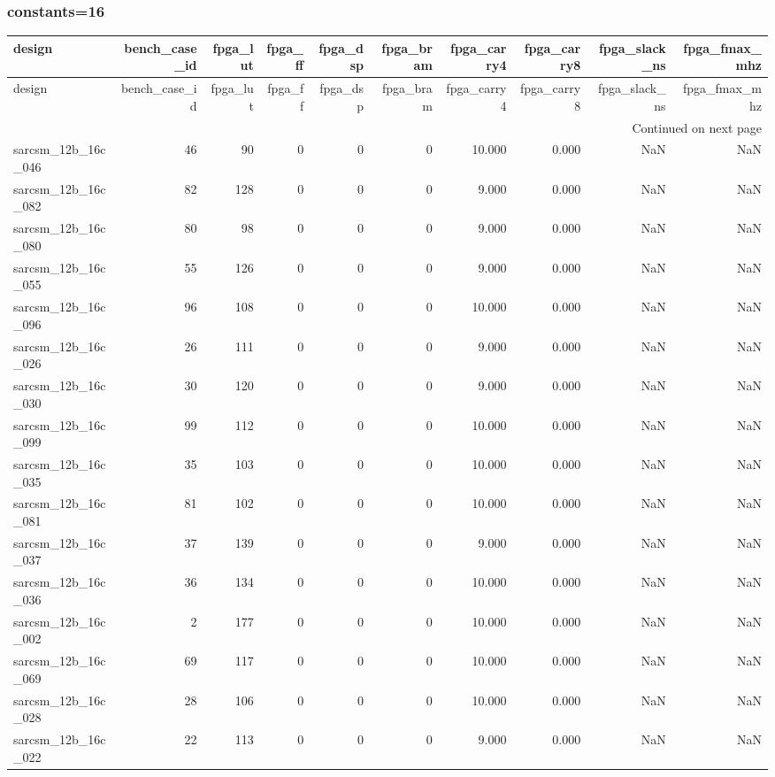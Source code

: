 \documentclass{article}
\begin{document}
\subsubsection*{constants=16}
\begin{longtable}{lrrrrrrrrr}
\toprule
design & bench\_case\_id & fpga\_lut & fpga\_ff & fpga\_dsp & fpga\_bram & fpga\_carry4 & fpga\_carry8 & fpga\_slack\_ns & fpga\_fmax\_mhz \\
\midrule
\endfirsthead
\toprule
design & bench\_case\_id & fpga\_lut & fpga\_ff & fpga\_dsp & fpga\_bram & fpga\_carry4 & fpga\_carry8 & fpga\_slack\_ns & fpga\_fmax\_mhz \\
\midrule
\endhead
\midrule
\multicolumn{10}{r}{Continued on next page} \\
\midrule
\endfoot
\bottomrule
\endlastfoot
sarcsm\_12b\_16c\_046 & 46 & 90 & 0 & 0 & 0 & 10.000 & 0.000 & NaN & NaN \\
sarcsm\_12b\_16c\_082 & 82 & 128 & 0 & 0 & 0 & 9.000 & 0.000 & NaN & NaN \\
sarcsm\_12b\_16c\_080 & 80 & 98 & 0 & 0 & 0 & 9.000 & 0.000 & NaN & NaN \\
sarcsm\_12b\_16c\_055 & 55 & 126 & 0 & 0 & 0 & 9.000 & 0.000 & NaN & NaN \\
sarcsm\_12b\_16c\_096 & 96 & 108 & 0 & 0 & 0 & 10.000 & 0.000 & NaN & NaN \\
sarcsm\_12b\_16c\_026 & 26 & 111 & 0 & 0 & 0 & 9.000 & 0.000 & NaN & NaN \\
sarcsm\_12b\_16c\_030 & 30 & 120 & 0 & 0 & 0 & 9.000 & 0.000 & NaN & NaN \\
sarcsm\_12b\_16c\_099 & 99 & 112 & 0 & 0 & 0 & 10.000 & 0.000 & NaN & NaN \\
sarcsm\_12b\_16c\_035 & 35 & 103 & 0 & 0 & 0 & 10.000 & 0.000 & NaN & NaN \\
sarcsm\_12b\_16c\_081 & 81 & 102 & 0 & 0 & 0 & 10.000 & 0.000 & NaN & NaN \\
sarcsm\_12b\_16c\_037 & 37 & 139 & 0 & 0 & 0 & 9.000 & 0.000 & NaN & NaN \\
sarcsm\_12b\_16c\_036 & 36 & 134 & 0 & 0 & 0 & 10.000 & 0.000 & NaN & NaN \\
sarcsm\_12b\_16c\_002 & 2 & 177 & 0 & 0 & 0 & 10.000 & 0.000 & NaN & NaN \\
sarcsm\_12b\_16c\_069 & 69 & 117 & 0 & 0 & 0 & 10.000 & 0.000 & NaN & NaN \\
sarcsm\_12b\_16c\_028 & 28 & 106 & 0 & 0 & 0 & 10.000 & 0.000 & NaN & NaN \\
sarcsm\_12b\_16c\_022 & 22 & 113 & 0 & 0 & 0 & 9.000 & 0.000 & NaN & NaN \\

\end{longtable}
\end{document}
